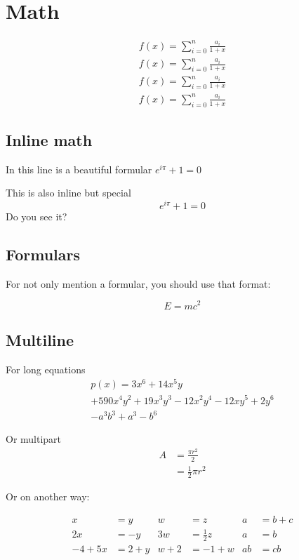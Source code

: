 \chapter{Math}

\begin{eqnarray*}
	f(x) = \sum_{i=0}^{n} \frac{a_i}{1+x} \\
	\textstyle f(x) = \textstyle \sum_{i=0}^{n} \frac{a_i}{1+x} \\
	\scriptstyle f(x) = \scriptstyle \sum_{i=0}^{n} \frac{a_i}{1+x} \\
	\scriptscriptstyle f(x) = \scriptscriptstyle \sum_{i=0}^{n} \frac{a_i}{1+x}
\end{eqnarray*}

\section{Inline math}
In this line is a beautiful formular $e^{i\pi} + 1 = 0$ \par
This is also inline but special $$e^{i\pi} + 1 = 0$$ Do you see it?

\section{Formulars}
For not only mention a formular, you should use that format:

\begin{equation}
E=mc^2
\end{equation}

\section{Multiline}

For long equations
\begin{multline}
p(x) = 3x^6 + 14x^5y \\+ 590x^4y^2 + 19x^3y^3
- 12x^2y^4 - 12xy^5 + 2y^6 \\- a^3b^3 + a^3 - b^6
\end{multline}


Or multipart
\begin{equation}
\begin{split}
A & = \frac{\pi r^2}{2} \\
& = \frac{1}{2} \pi r^2
\end{split}
\end{equation}

Or on another way:


\begin{align}
x&=y           &  w &=z              &  a&=b+c\\
2x&=-y         &  3w&=\frac{1}{2}z   &  a&=b\\
-4 + 5x&=2+y   &  w+2&=-1+w          &  ab&=cb
\end{align}

